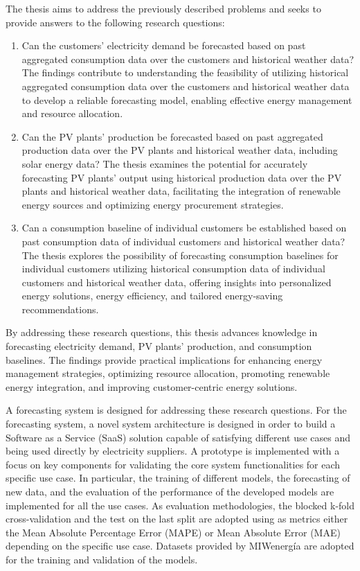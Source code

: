 The thesis aims to address the previously described problems and seeks to provide answers to the following research questions:
\begin{enumerate}
  \item Can the customers' electricity demand be forecasted based on past aggregated consumption data over the customers and historical weather data? The findings contribute to understanding the feasibility of utilizing historical aggregated consumption data over the customers and historical weather data to develop a reliable forecasting model, enabling effective energy management and resource allocation.
  \item Can the PV plants' production be forecasted based on past aggregated production data over the PV plants and historical weather data, including solar energy data? The thesis examines the potential for accurately forecasting PV plants' output using historical production data over the PV plants and historical weather data, facilitating the integration of renewable energy sources and optimizing energy procurement strategies.
  \item Can a consumption baseline of individual customers be established based on past consumption data of individual customers and historical weather data? The thesis explores the possibility of forecasting consumption baselines for individual customers utilizing historical consumption data of individual customers and historical weather data, offering insights into personalized energy solutions, energy efficiency, and tailored energy-saving recommendations.
\end{enumerate}
By addressing these research questions, this thesis advances knowledge in forecasting electricity demand, PV plants' production, and consumption baselines.
The findings provide practical implications for enhancing energy management strategies, optimizing resource allocation, promoting renewable energy integration, and improving customer-centric energy solutions.

A forecasting system is designed for addressing these research questions.
For the forecasting system, a novel system architecture is designed in order to build a Software as a Service (SaaS) solution capable of satisfying different use cases and being used directly by electricity suppliers.
A prototype is implemented with a focus on key components for validating the core system functionalities for each specific use case.
In particular, the training of different models, the forecasting of new data, and the evaluation of the performance of the developed models are implemented for all the use cases.
As evaluation methodologies, the blocked k-fold cross-validation and the test on the last split are adopted using as metrics either the Mean Absolute Percentage Error (MAPE) or Mean Absolute Error (MAE) depending on the specific use case.
Datasets provided by MIWenergía are adopted for the training and validation of the models.

